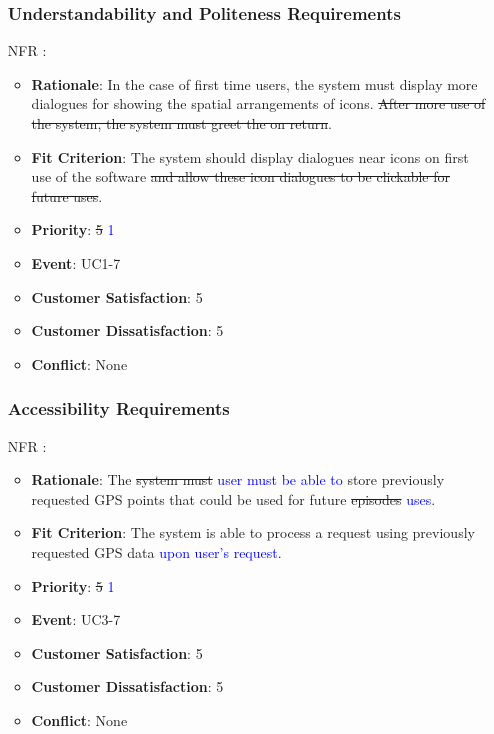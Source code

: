 \documentclass[12pt, titlepage]{article}
\newcounter{reqnum} %
\newcounter{freqnum} %
\begin{document}
\begin{itemize}
\subsubsection{Understandability and Politeness Requirements}
\item[NFR\refstepcounter{freqnum}\thefreqnum
\label{NFR}:] 
\begin{itemize}
    \item \textbf{Rationale}: In the case of first time users, the system must display more dialogues for showing the spatial arrangements of icons. \sout{After more use of the system, the system must greet the on return}.
    \item \textbf{Fit Criterion}: The system should display dialogues near icons on first use of the software\sout{ and allow these icon dialogues to be clickable for future uses}. 
    \item \textbf{Priority}: \sout{5} \textcolor{blue}{1}
    \item \textbf{Event}: UC1-7%
    \item \textbf{Customer Satisfaction}: 5
    \item \textbf{Customer Dissatisfaction}: 5
    \item \textbf{Conflict}: None
\end{itemize}
\subsubsection{Accessibility Requirements}
\item[NFR\refstepcounter{freqnum}\thefreqnum
\label{NFR}:] 
\begin{itemize}
    \item \textbf{Rationale}: The \sout{system must} \textcolor{blue}{user must be able to} store previously requested GPS points that could be used for future \sout{episodes} \textcolor{blue}{uses}.
    \item \textbf{Fit Criterion}: The system is able to process a request using previously requested GPS data \textcolor{blue}{upon user's request}.
    \item \textbf{Priority}: \sout{5} \textcolor{blue}{1}
    \item \textbf{Event}: UC3-7%
    \item \textbf{Customer Satisfaction}: 5
    \item \textbf{Customer Dissatisfaction}: 5
    \item \textbf{Conflict}: None
\end{itemize}

\end{itemize}
\end{document}
